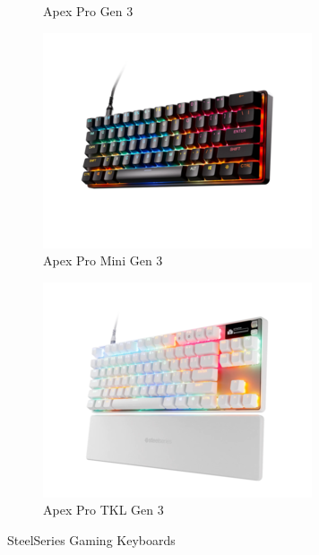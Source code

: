 \begin{itemize}
\begin{figure}[h!]
\begin{subfigure}[b]{0.25\textwidth}
        \caption{Apex Pro Gen 3}
    \end{subfigure}
    \hfill
    \begin{subfigure}[b]{0.25\textwidth}
        \includegraphics[width=\textwidth]{ressources/kb_2.png}
        \caption{Apex Pro Mini Gen 3}
    \end{subfigure}
    \hfill
    \begin{subfigure}[b]{0.25\textwidth}
        \includegraphics[width=\textwidth]{ressources/kb_3.png}
        \caption{Apex Pro TKL Gen 3}
    \end{subfigure}
    \caption{SteelSeries Gaming Keyboards}

\end{figure}
\end{itemize}
